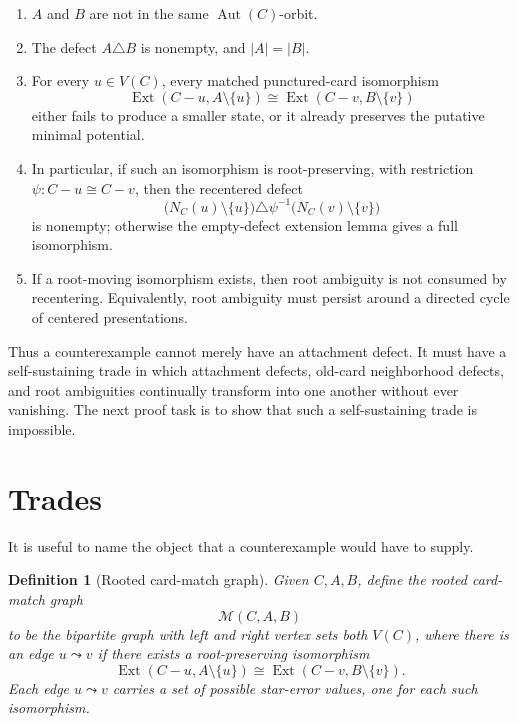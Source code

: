 \documentclass[11pt]{article}
\newtheorem{definition}{Definition}
\newcommand{\Ext}{\operatorname{Ext}}
\newcommand{\Aut}{\operatorname{Aut}}
\begin{document}
\begin{enumerate}[leftmargin=2em]
  \item \(A\) and \(B\) are not in the same \(\Aut(C)\)-orbit.

  \item The defect \(A\triangle B\) is nonempty, and \(|A|=|B|\).

  \item For every \(u\in V(C)\), every matched punctured-card isomorphism
  \[
    \Ext(C-u,A\setminus\{u\})
    \cong
    \Ext(C-v,B\setminus\{v\})
  \]
  either fails to produce a smaller state, or it already preserves the
  putative minimal potential.

  \item In particular, if such an isomorphism is root-preserving, with
  restriction \(\psi:C-u\cong C-v\), then the recentered defect
  \[
    \bigl(N_C(u)\setminus\{u\}\bigr)
    \triangle
    \psi^{-1}\bigl(N_C(v)\setminus\{v\}\bigr)
  \]
  is nonempty; otherwise the empty-defect extension lemma gives a full
  isomorphism.

  \item If a root-moving isomorphism exists, then root ambiguity is not
  consumed by recentering.  Equivalently, root ambiguity must persist around a
  directed cycle of centered presentations.
\end{enumerate}

Thus a counterexample cannot merely have an attachment defect.  It must have a
self-sustaining trade in which attachment defects, old-card neighborhood
defects, and root ambiguities continually transform into one another without
ever vanishing.  The next proof task is to show that such a self-sustaining
trade is impossible.

\section{Trades}

It is useful to name the object that a counterexample would have to supply.

\begin{definition}[Rooted card-match graph]
Given \(C,A,B\), define the rooted card-match graph
\[
  \mathcal M(C,A,B)
\]
to be the bipartite graph with left and right vertex sets both \(V(C)\), where
there is an edge \(u\leadsto v\) if there exists a root-preserving
isomorphism
\[
  \Ext(C-u,A\setminus\{u\})
  \cong
  \Ext(C-v,B\setminus\{v\}).
\]
Each edge \(u\leadsto v\) carries a set of possible star-error values, one
for each such isomorphism.
\end{definition}
\end{document}
